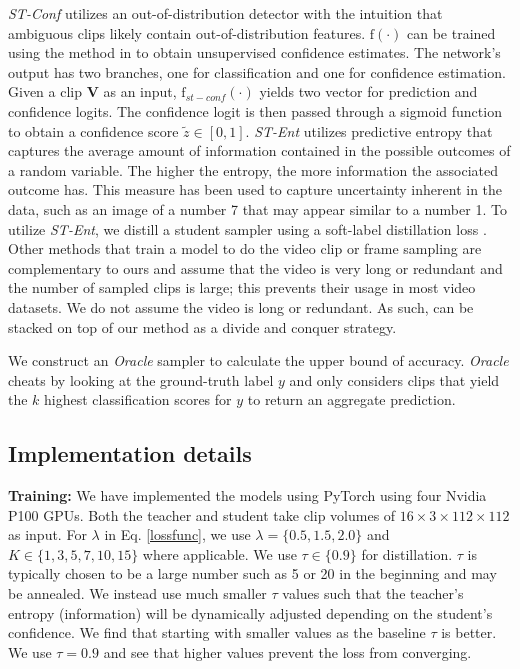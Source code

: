 \documentclass[a4paper,conference]{IEEEtran}
\begin{document}
\textit{ST-Conf} utilizes an out-of-distribution detector with the intuition that ambiguous clips likely contain out-of-distribution features. $\mathrm{f}(\cdot)$ can be trained using the method in \cite{devries2018learning} to obtain unsupervised confidence estimates. The network's output has two branches, one for classification and one for confidence estimation. Given a clip $\mathbf{V}$ as an input, $\mathrm{f}_{st-conf}(\cdot)$ yields two vector for prediction and confidence logits. The confidence logit is then passed through a sigmoid function to obtain a confidence score $\tilde{z} \in [0,1]$. \textit{ST-Ent} utilizes predictive entropy \cite{shannon1948mathematical} that captures the average amount of information contained in the possible outcomes of a random variable. The higher the entropy, the more information the associated outcome has. This measure has been used \cite{gal2016uncertainty, hein2019relu} to capture uncertainty inherent in the data, such as an image of a number 7 that may appear similar to a number 1. To utilize \textit{ST-Ent}, we distill a student sampler using a soft-label distillation loss \cite{hinton2015distilling}. Other methods that train a model to do the video clip or frame sampling \cite{korbar2019scsampler, gao2020listen, wu2019adaframe} are complementary to ours and assume that the video is very long or redundant and the number of sampled clips is large; this prevents their usage in most video datasets. We do not assume the video is long or redundant. As such, \cite{gao2020listen, korbar2019scsampler, wu2019adaframe} can be stacked on top of our method as a divide and conquer strategy.

We construct an \textit{Oracle} sampler \cite{korbar2019scsampler} to calculate the upper bound of accuracy. \textit{Oracle} cheats by looking at the ground-truth label $y$ and only considers clips that yield the $k$ highest classification scores for $y$ to return an aggregate prediction.

\subsection{Implementation details}

{\bf Training:} We have implemented the models using PyTorch using four Nvidia P100 GPUs. Both the teacher and student take clip volumes of $16 \times 3 \times 112 \times 112$ as input. For $\lambda$ in Eq. \eqref{lossfunc}, we use $\lambda = \{0.5, 1.5, 2.0\}$ and $K \in \{1, 3, 5, 7, 10, 15\}$ where applicable.  We use $\tau \in \{ 0.9 \}$ for distillation. $\tau$ is typically \cite{hinton2015distilling} chosen to be a large number such as 5 or 20 in the beginning and may be annealed. We instead use much smaller $\tau$ values such that the teacher's entropy (information) will be dynamically adjusted depending on the student's confidence. We find that starting with smaller values as the baseline $\tau$ is better. We use $\tau = 0.9$ and see that higher values prevent the loss from converging.
\end{document}
